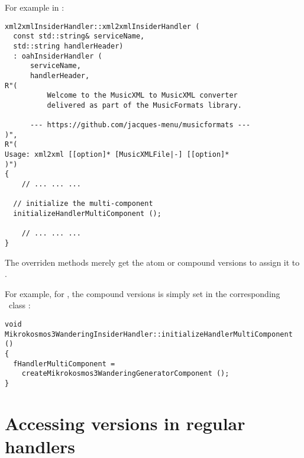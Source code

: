 For example in :
\begin{lstlisting}[language=CPlusPlus]
xml2xmlInsiderHandler::xml2xmlInsiderHandler (
  const std::string& serviceName,
  std::string handlerHeader)
  : oahInsiderHandler (
      serviceName,
      handlerHeader,
R"(
          Welcome to the MusicXML to MusicXML converter
          delivered as part of the MusicFormats library.

      --- https://github.com/jacques-menu/musicformats ---
)",
R"(
Usage: xml2xml [[option]* [MusicXMLFile|-] [[option]*
)")
{
	// ... ... ...

  // initialize the multi-component
  initializeHandlerMultiComponent ();

	// ... ... ...
}
\end{lstlisting}

The overriden  methods merely get the atom or compound versions to assign it to .

For example, for , the compound versions is simply set in the corresponding \insider\ class   :
\begin{lstlisting}[language=CPlusPlus]
void Mikrokosmos3WanderingInsiderHandler::initializeHandlerMultiComponent ()
{
  fHandlerMultiComponent =
    createMikrokosmos3WanderingGeneratorComponent ();
}
\end{lstlisting}


\section{Accessing versions in regular handlers}\label{Accessing versions in regular handlers}

